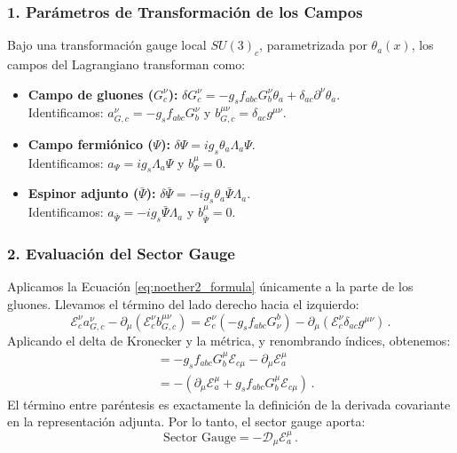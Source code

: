 \subsubsection*{1. Parámetros de Transformación de los Campos}
Bajo una transformación gauge local $SU(3)_c$, parametrizada por $\theta_a(x)$, los campos del Lagrangiano transforman como:
\begin{itemize}
    \item \textbf{Campo de gluones ($G^\nu_c$):} 
    $\delta G^\nu_c = -g_s f_{abc} G^\nu_b \theta_a + \delta_{ac} \partial^\nu \theta_a$. \\
    Identificamos: $a^\nu_{G, c} = -g_s f_{abc} G^\nu_b$ y $b^{\mu\nu}_{G, c} = \delta_{ac} g^{\mu\nu}$.
    
    \item \textbf{Campo fermiónico ($\Psi$):}
    $\delta \Psi = i g_s \theta_a \Lambda_a \Psi$. \\
    Identificamos: $a_{\Psi} = i g_s \Lambda_a \Psi$ y $b^\mu_{\Psi} = 0$.
    
    \item \textbf{Espinor adjunto ($\bar{\Psi}$):}
    $\delta \bar{\Psi} = -i g_s \theta_a \bar{\Psi} \Lambda_a$. \\
    Identificamos: $a_{\bar{\Psi}} = -i g_s \bar{\Psi} \Lambda_a$ y $b^\mu_{\bar{\Psi}} = 0$.
\end{itemize}

\subsubsection*{2. Evaluación del Sector Gauge}
Aplicamos la Ecuación \eqref{eq:noether2_formula} únicamente a la parte de los gluones. Llevamos el término del lado derecho hacia el izquierdo:
\begin{equation}
    \mathcal{E}_{c}^\nu a^\nu_{G, c} - \partial_\mu (\mathcal{E}_{c}^\nu b^{\mu\nu}_{G, c}) = \mathcal{E}_{c}^\nu (-g_s f_{abc} G_\nu^b) - \partial_\mu (\mathcal{E}_{c}^\nu \delta_{ac} g^{\mu\nu}) \, .
\end{equation}
Aplicando el delta de Kronecker y la métrica, y renombrando índices, obtenemos:
\begin{align}
    &= -g_s f_{abc} G^\mu_b \mathcal{E}_{c\mu} - \partial_\mu \mathcal{E}_{a}^\mu \nonumber \\
    &= - \left( \partial_\mu \mathcal{E}_{a}^\mu + g_s f_{abc} G^\mu_b \mathcal{E}_{c\mu} \right) \, .
\end{align}
El término entre paréntesis es exactamente la definición de la derivada covariante en la representación adjunta. Por lo tanto, el sector gauge aporta:
\begin{equation}
    \text{Sector Gauge} = - \mathcal{D}_\mu \mathcal{E}_{a}^\mu \, .
    \label{eq:sector_gauge}
\end{equation}

